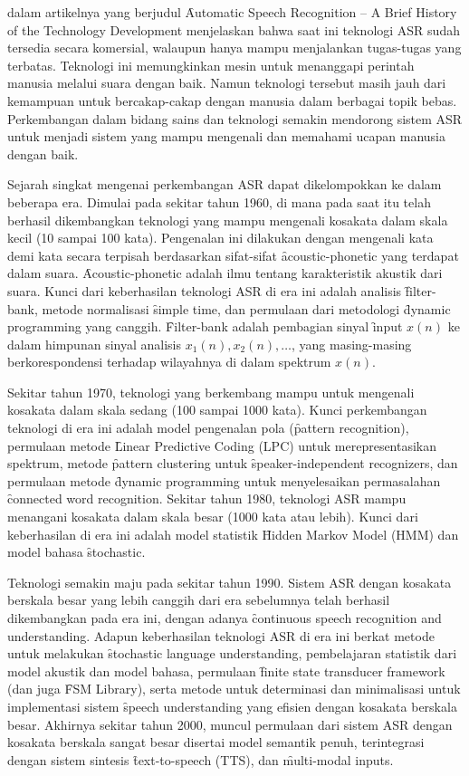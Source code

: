 \cite{juang2005automatic} dalam artikelnya yang berjudul \f{Automatic Speech Recognition -- A Brief History of the Technology Development} menjelaskan bahwa saat ini teknologi ASR sudah tersedia secara komersial, walaupun hanya mampu menjalankan tugas-tugas yang terbatas. Teknologi ini memungkinkan mesin untuk menanggapi perintah manusia melalui suara dengan baik. Namun teknologi tersebut masih jauh dari kemampuan untuk bercakap-cakap dengan manusia dalam berbagai topik bebas. Perkembangan dalam bidang sains dan teknologi semakin mendorong sistem ASR untuk menjadi sistem yang mampu mengenali dan memahami ucapan manusia dengan baik.

Sejarah singkat mengenai perkembangan ASR dapat dikelompokkan ke dalam beberapa era. Dimulai pada sekitar tahun 1960, di mana pada saat itu telah berhasil dikembangkan teknologi yang mampu mengenali kosakata dalam skala kecil (10 sampai 100 kata). Pengenalan ini dilakukan dengan mengenali kata demi kata secara terpisah berdasarkan sifat-sifat \f{acoustic-phonetic} yang terdapat dalam suara. \f{Acoustic-phonetic} adalah ilmu tentang karakteristik akustik dari suara. Kunci dari keberhasilan teknologi ASR di era ini adalah analisis \f{filter-bank}, metode normalisasi \f{simple time}, dan permulaan dari metodologi \f{dynamic programming} yang canggih. \f{Filter-bank} adalah pembagian sinyal \f{input} $x(n)$ ke dalam himpunan sinyal analisis  $x_1(n), x_2(n), \ldots$, yang masing-masing berkorespondensi terhadap wilayahnya di dalam spektrum $x(n)$.

Sekitar tahun 1970, teknologi yang berkembang mampu untuk mengenali kosakata dalam skala sedang (100 sampai 1000 kata). Kunci perkembangan teknologi di era ini adalah model pengenalan pola (\f{pattern recognition}), permulaan metode \f{Linear Predictive Coding} (LPC) untuk merepresentasikan spektrum, metode \f{pattern clustering} untuk \f{speaker-independent recognizers}, dan permulaan metode \f{dynamic programming} untuk menyelesaikan permasalahan \f{connected word recognition}. Sekitar tahun 1980, teknologi ASR mampu menangani kosakata dalam skala besar (1000 kata atau lebih). Kunci dari keberhasilan di era ini adalah model statistik \f{Hidden Markov Model} (HMM) dan model bahasa \f{stochastic}.

Teknologi semakin maju pada sekitar tahun 1990. Sistem ASR dengan kosakata berskala besar yang lebih canggih dari era sebelumnya telah berhasil dikembangkan pada era ini, dengan adanya \f{continuous speech recognition and understanding}. Adapun keberhasilan teknologi ASR di era ini berkat metode untuk melakukan \f{stochastic language understanding}, pembelajaran statistik dari model akustik dan model bahasa, permulaan \f{finite state transducer framework} (dan juga \f{FSM Library}), serta metode untuk determinasi dan minimalisasi untuk implementasi sistem \f{speech understanding} yang efisien dengan kosakata berskala besar. Akhirnya sekitar tahun 2000, muncul permulaan dari sistem ASR dengan kosakata berskala sangat besar disertai model semantik penuh, terintegrasi dengan sistem sintesis \f{text-to-speech} (TTS), dan \f{multi-modal inputs}.



